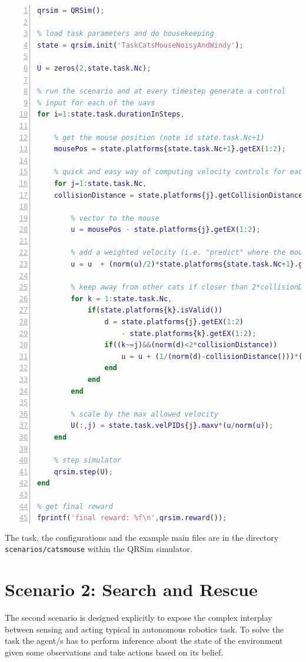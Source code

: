 \documentclass[a4paper,11pt]{report}
\newcommand{\sname}{QRSim\xspace}
\newcommand\mytexttt[1]{\texttt{\hyphenchar\font=45\relax #1}}
\begin{document}
\begin{lstlisting}[float=ht!bp,caption=main\_catsmouse.m,language=Matlab,frame=lines,label=lst:mcm,numbers=left,basicstyle=\small]
qrsim = QRSim();

% load task parameters and do housekeeping
state = qrsim.init('TaskCatsMouseNoisyAndWindy');

U = zeros(2,state.task.Nc);

% run the scenario and at every timestep generate a control
% input for each of the uavs
for i=1:state.task.durationInSteps,
    
    % get the mouse position (note id state.task.Nc+1)
    mousePos = state.platforms{state.task.Nc+1}.getEX(1:2);
    
    % quick and easy way of computing velocity controls for each cat 
    for j=1:state.task.Nc,
	collisionDistance = state.platforms{j}.getCollisionDistance();
		
        % vector to the mouse
        u = mousePos - state.platforms{j}.getEX(1:2);
        
        % add a weighted velocity (i.e. "predict" where the mouse will be)
        u = u  + (norm(u)/2)*state.platforms{state.task.Nc+1}.getEX(18:19);
        
        % keep away from other cats if closer than 2*collisionDistance        
        for k = 1:state.task.Nc,
            if(state.platforms{k}.isValid())                  
                d = state.platforms{j}.getEX(1:2) 
                    - state.platforms{k}.getEX(1:2);
                if((k~=j)&&(norm(d)<2*collisionDistance))
                    u = u + (1/(norm(d)-collisionDistance()))*(d/norm(d));
                end
            end
        end
        
        % scale by the max allowed velocity
        U(:,j) = state.task.velPIDs{j}.maxv*(u/norm(u));
    end
    
    % step simulator
    qrsim.step(U);
end

% get final reward
fprintf('final reward: %f\n',qrsim.reward());

\end{lstlisting}

The task, the configurations and the example main files are in the directory \mytexttt{scenarios/catsmouse} within the \sname simulator. 

\newpage
\chapter{Scenario 2: Search and Rescue}
The second scenario is designed explicitly to expose the complex interplay between sensing and acting typical in autonomous robotics task. To solve the task the agent/s has to perform inference about the state of the environment given some observations and take actions based on its belief. 
\end{document}
